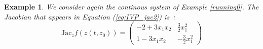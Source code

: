 \documentclass{sig-alternate-05-2015} %
\newcommand\ForAuthors[1]%
 {\par\smallskip                     %
  \begin{center}%
   \fbox%
   {\parbox{0.9\linewidth}%
    {\raggedright\sc--- #1}%
   }%
  \end{center}%
  \par\smallskip                     %
 }
\newtheorem{example}{Example}
\begin{document}
\begin{example}
\label{running1}
We consider again the continous system of Example \ref{running0}. 
The Jacobian that appears in Equation (\ref{eq:IVP_jac2}) is~: 
$$
\mbox{Jac}_z f(z(t,z_0)) = \left(\begin{array}{cc} 
-2+3x_1x_2  & \frac{3}{2} x^2_1 \\
1-3x_1x_2 & -\frac{3}{2} x^2_1
\end{array}\right)
$$
\end{example}
\end{document}

